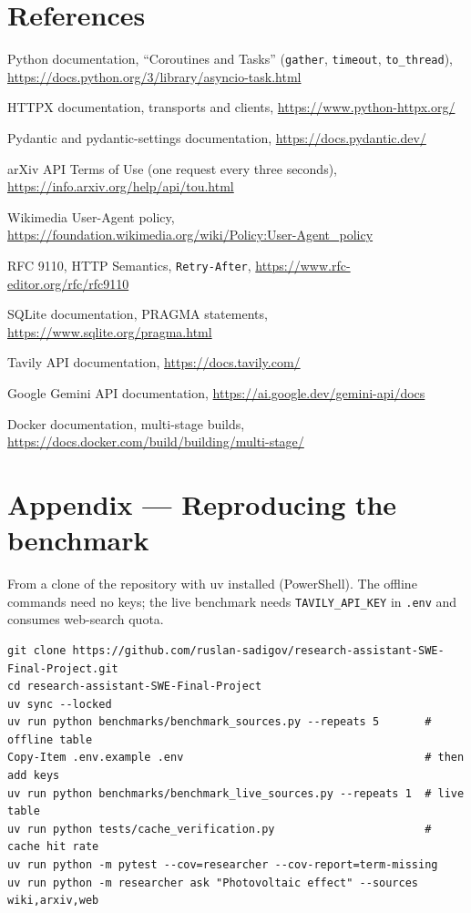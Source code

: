 \documentclass[11pt,a4paper]{article}
\newcommand{\cmd}[1]{\texttt{#1}}
\begin{document}
\section*{References}
\begin{enumerate}[label={[\arabic*]},leftmargin=2.4em,itemsep=2pt]
  \item Python documentation, ``Coroutines and Tasks'' (\cmd{gather}, \cmd{timeout}, \cmd{to\_thread}), \url{https://docs.python.org/3/library/asyncio-task.html}
  \item HTTPX documentation, transports and clients, \url{https://www.python-httpx.org/}
  \item Pydantic and pydantic-settings documentation, \url{https://docs.pydantic.dev/}
  \item {}\label{arxiv}arXiv API Terms of Use (one request every three seconds), \url{https://info.arxiv.org/help/api/tou.html}
  \item {}\label{wikiua}Wikimedia User-Agent policy, \url{https://foundation.wikimedia.org/wiki/Policy:User-Agent_policy}
  \item RFC 9110, HTTP Semantics, \texttt{Retry-After}, \url{https://www.rfc-editor.org/rfc/rfc9110}
  \item SQLite documentation, PRAGMA statements, \url{https://www.sqlite.org/pragma.html}
  \item Tavily API documentation, \url{https://docs.tavily.com/}
  \item Google Gemini API documentation, \url{https://ai.google.dev/gemini-api/docs}
  \item Docker documentation, multi-stage builds, \url{https://docs.docker.com/build/building/multi-stage/}
\end{enumerate}

\appendix
\section{Appendix --- Reproducing the benchmark}

From a clone of the repository with uv installed (PowerShell). The offline
commands need no keys; the live benchmark needs \cmd{TAVILY\_API\_KEY} in
\cmd{.env} and consumes web-search quota.

\begin{lstlisting}[style=plain]
git clone https://github.com/ruslan-sadigov/research-assistant-SWE-Final-Project.git
cd research-assistant-SWE-Final-Project
uv sync --locked
uv run python benchmarks/benchmark_sources.py --repeats 5       # offline table
Copy-Item .env.example .env                                     # then add keys
uv run python benchmarks/benchmark_live_sources.py --repeats 1  # live table
uv run python tests/cache_verification.py                       # cache hit rate
uv run python -m pytest --cov=researcher --cov-report=term-missing
uv run python -m researcher ask "Photovoltaic effect" --sources wiki,arxiv,web
\end{lstlisting}
\end{document}
